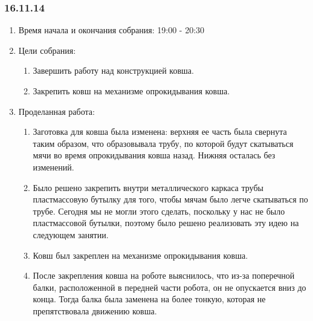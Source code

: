 
\subsubsection{16.11.14}

\begin{enumerate} 
	\item Время начала и окончания собрания:
	19:00 - 20:30
	\item Цели собрания:
	\begin{enumerate}
		\item Завершить работу над конструкцией ковша.
		
		\item Закрепить ковш на механизме опрокидывания ковша.
		
	\end{enumerate}
	
	\item Проделанная работа:
	\begin{enumerate}
		\item Заготовка для ковша была изменена: верхняя ее часть была свернута таким образом, что образовывала трубу, по которой будут скатываться мячи во время опрокидывания ковша назад. Нижняя осталась без изменений.
		
		\item Было решено закрепить внутри металлического каркаса трубы пластмассовую бутылку для того, чтобы мячам было легче скатываться по трубе. Сегодня мы не могли этого сделать, поскольку у нас не было пластмассовой бутылки, поэтому было решено реализовать эту идею на следующем занятии.
		
		\item Ковш был закреплен на механизме опрокидывания ковша.
		
		\item После закрепления ковша на роботе выяснилось, что из-за поперечной балки, расположенной в передней части робота, он не опускается вниз до конца. Тогда балка была заменена на более тонкую, которая не препятствовала движению ковша.
		

\end{enumerate}
\end{enumerate}
